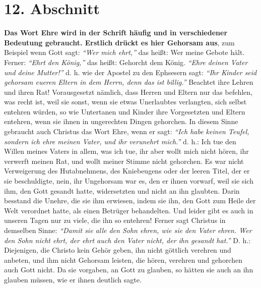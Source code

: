 \section{12. Abschnitt} \label{kap9_ab12}

\label{ref:09_12_ehre} \textbf{Das Wort Ehre
wird in der Schrift
häufig und in verschiedener Bedeutung
gebraucht. Erstlich drückt es hier Gehorsam aus}, zum Beispiel wenn
Gott sagt:
\textit{"`Wer mich ehrt,"'}
das heißt: Wer meine Gebote hält. Ferner:
\textit{"`Ehrt den König,"'}
das heißt: Gehorcht dem König.
\textit{"`Ehre deinen Vater und deine Mutter!"'}
d. h. wie der
Apostel zu den Ephsesern sagt:
\textit{"`Ihr Kinder seid gehorsam eueren Eltern in dem
Herrn, denn das ist billig."'}
Beachtet ihre Lehren und
ihren Rat! Vorausgesetzt nämlich, dass Herren und Eltern nur das befehlen, was
recht ist, weil sie sonst, wenn sie etwas Unerlaubtes verlangten, sich selbst
entehren würden, so wie Untertanen und Kinder ihre Vorgesetzten und Eltern
entehren, wenn sie ihnen in ungerechten Dingen gehorchen. In diesem Sinne
gebraucht auch Christus das Wort Ehre, wenn er sagt:
\textit{"`Ich habe keinen Teufel,
sondern ich ehre meinen Vater, und ihr verunehrt mich."'}
d. h.: Ich tue den Willen meines Vaters in allem, was ich tue, ihr aber wollt
mich nicht hören, ihr verwerft meinen Rat, und wollt meiner Stimme nicht
gehorchen. Es war nicht Verweigerung des Hutabnehmens, des Kniebeugens oder der
leeren Titel, der er sie beschuldigte, nein, ihr Ungehorsam war es, den er ihnen
vorwarf, weil sie sich ihm, den Gott gesandt hatte, widersetzten und nicht an
ihn glaubten. Darin besstand die Unehre, die sie ihm erwiesen, indem sie ihn,
den Gott zum Heile der Welt verordnet hatte, als einen Betrüger behandelten. Und
leider gibt es auch in unseren Tagen nur zu viele, die ihn so entehren! Ferner
sagt Christus in demselben Sinne:
\textit{"`Damit sie alle den Sohn ehren, wie sie den
Vater ehren. Wer den Sohn nicht ehrt, der ehrt auch den Vater nicht, der ihn
gesandt hat."'}
D. h.: Diejenigen, die Christo kein Gehör
geben, ihn nicht göttlich verehren und anbeten, und ihm nicht Gehorsam leisten,
die hören, verehren und gehorchen auch Gott nicht. Da sie vorgaben, an Gott zu
glauben, so hätten sie auch an ihn glauben müssen, wie er ihnen deutlich sagte.
